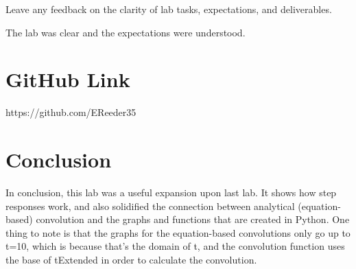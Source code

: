 \documentclass[12pt]{article}
\begin{document}
Leave any feedback on the clarity of lab tasks, expectations, and deliverables.

The lab was clear and the expectations were understood.

\section{GitHub Link}

https://github.com/EReeder35

\newpage

\section{Conclusion}

In conclusion, this lab was a useful expansion upon last lab. It shows how step responses work, and also solidified the connection between analytical (equation-based) convolution and the graphs and functions that are created in Python. One thing to note is that the graphs for the equation-based convolutions only go up to t=10, which is because that's the domain of t, and the convolution function uses the base of tExtended in order to calculate the convolution.
\end{document}
